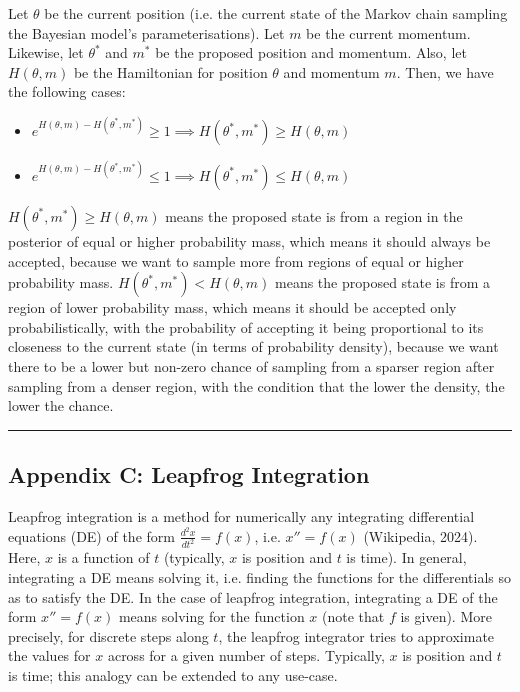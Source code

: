 \documentclass[conference]{IEEEtran}
\begin{document}
Let $\theta$ be the current position (i.e. the current state of the Markov chain sampling the Bayesian model's parameterisations). Let $m$ be the current momentum. Likewise, let $\theta^*$ and $m^*$ be the proposed position and momentum. Also, let $H(\theta, m)$ be the Hamiltonian for position $\theta$ and momentum $m$. Then, we have the following cases:\\

\begin{itemize}
	\item $e^{H(\theta, m) - H(\theta^*, m^*)} \geq 1 \implies H(\theta^*, m^*) \geq H(\theta, m)$
	\item $e^{H(\theta, m) - H(\theta^*, m^*)} \leq 1 \implies H(\theta^*, m^*) \leq H(\theta, m)$\\
\end{itemize}

$H(\theta^*, m^*) \geq H(\theta, m)$ means the proposed state is from a region in the posterior of equal or higher probability mass, which means it should always be accepted, because we want to sample more from regions of equal or higher probability mass. $H(\theta^*, m^*) < H(\theta, m)$ means the proposed state is from a region of lower probability mass, which means it should be accepted only probabilistically, with the probability of accepting it being proportional to its closeness to the current state (in terms of probability density), because we want there to be a lower but non-zero chance of sampling from a sparser region after sampling from a denser region, with the condition that the lower the density, the lower the chance.

\par\noindent\rule{0.49\textwidth}{0.1pt}

\subsection*{Appendix C: Leapfrog Integration}
Leapfrog integration is a method for numerically any integrating differential equations (DE) of the form $\frac{d^2x}{dt^2} = f(x)$, i.e. $x'' = f(x)$ (Wikipedia, 2024). Here, $x$ is a function of $t$ (typically, $x$ is position and $t$ is time). In general, integrating a DE means solving it, i.e. finding the functions for the differentials so as to satisfy the DE. In the case of leapfrog integration, integrating a DE of the form $x'' = f(x)$ means solving for the function $x$ (note that $f$ is given). More precisely, for discrete steps along $t$, the leapfrog integrator tries to approximate the values for $x$ across for a given number of steps. Typically, $x$ is position and $t$ is time; this analogy can be extended to any use-case.\\
\end{document}
